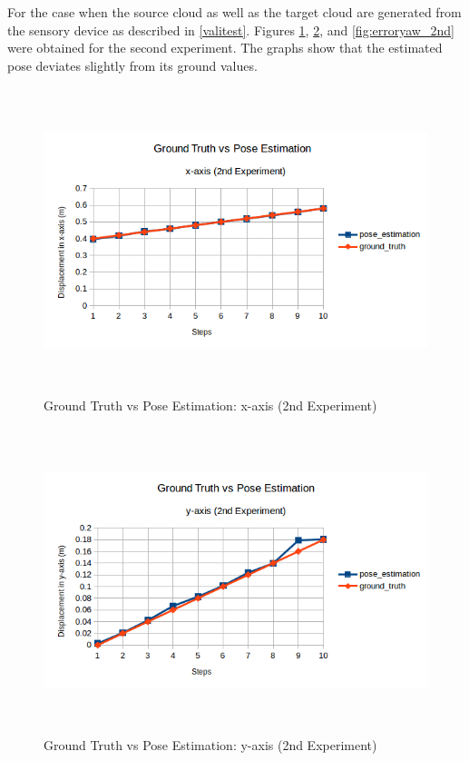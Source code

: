 For the case when the source cloud as well as the target cloud are generated from the sensory device as described in \ref{valitest}. Figures \ref{fig:errorx_2nd}, \ref{fig:errory_2nd}, and \ref{fig:erroryaw_2nd} were obtained for the second experiment. The graphs show that the estimated pose deviates slightly from its ground values.
\begin{figure}[!h]
\begin{center}
\includegraphics[width=5in, height=3.5in]{figures05/2_x_validation.png}
\caption{Ground Truth vs Pose Estimation: x-axis (2nd Experiment)}
\label{fig:errorx_2nd}
\end{center}
\end{figure}
\begin{figure}[!h]
\begin{center}
\includegraphics[width=5in, height=3.5in]{figures05/2_y_validation.png}
\caption{Ground Truth vs Pose Estimation: y-axis (2nd Experiment)}
\label{fig:errory_2nd}
\end{center}
\end{figure}
